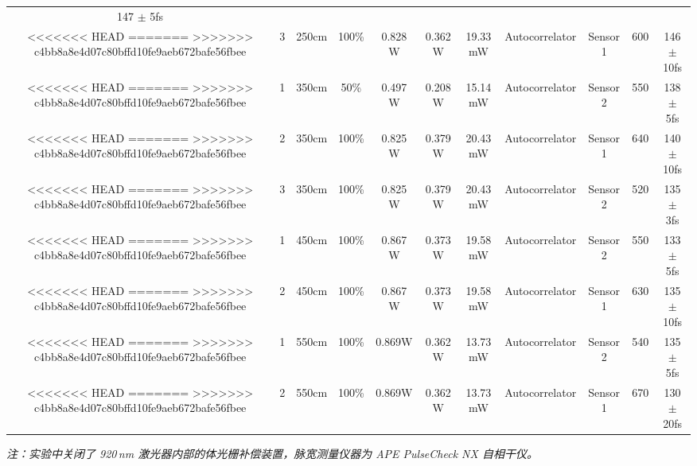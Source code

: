 \begin{table}[htbp]
{\begin{tabular}{ccccccccccc}
  147 $\pm$ 5fs \\
<<<<<<< HEAD
\rowcolor[HTML]{E7EAED}
=======
\rowcolor[HTML]{E7EAED} 
>>>>>>> c4bb8a8e4d07c80bffd10fe9aeb672bafe56fbee
\multirow{-3}{*}{\cellcolor[HTML]{E7EAED}1} &
  3 &
  \cellcolor[HTML]{FFC000}250cm &
  100\% &
  0.828 W &
  0.362 W &
  19.33 mW &
  Autocorrelator &
  Sensor 1 &
  600 &
  146 $\pm$ 10fs \\ \hline
<<<<<<< HEAD
\rowcolor[HTML]{E7EAED}
=======
\rowcolor[HTML]{E7EAED} 
>>>>>>> c4bb8a8e4d07c80bffd10fe9aeb672bafe56fbee
\cellcolor[HTML]{E7EAED} &
  1 &
  \cellcolor[HTML]{83CBEB}350cm &
  50\% &
  0.497 W &
  0.208 W &
  15.14 mW &
  Autocorrelator &
  Sensor 2 &
  550 &
  138 $\pm$ 5fs \\
<<<<<<< HEAD
\rowcolor[HTML]{E7EAED}
=======
\rowcolor[HTML]{E7EAED} 
>>>>>>> c4bb8a8e4d07c80bffd10fe9aeb672bafe56fbee
\cellcolor[HTML]{E7EAED} &
  2 &
  \cellcolor[HTML]{83CBEB}350cm &
  100\% &
  0.825 W &
  0.379 W &
  20.43 mW &
  Autocorrelator &
  Sensor 1 &
  640 &
  140 $\pm$ 10fs \\
<<<<<<< HEAD
\rowcolor[HTML]{E7EAED}
=======
\rowcolor[HTML]{E7EAED} 
>>>>>>> c4bb8a8e4d07c80bffd10fe9aeb672bafe56fbee
\multirow{-3}{*}{\cellcolor[HTML]{E7EAED}2} &
  3 &
  \cellcolor[HTML]{83CBEB}350cm &
  100\% &
  0.825 W &
  0.379 W &
  20.43 mW &
  Autocorrelator &
  Sensor 2 &
  520 &
  135 $\pm$ 3fs \\ \hline
<<<<<<< HEAD
\rowcolor[HTML]{E7EAED}
=======
\rowcolor[HTML]{E7EAED} 
>>>>>>> c4bb8a8e4d07c80bffd10fe9aeb672bafe56fbee
\cellcolor[HTML]{E7EAED} &
  1 &
  \cellcolor[HTML]{E59EDD}450cm &
  100\% &
  0.867 W &
  0.373 W &
  19.58 mW &
  Autocorrelator &
  Sensor 2 &
  550 &
  133 $\pm$ 5fs \\
<<<<<<< HEAD
\rowcolor[HTML]{E7EAED}
=======
\rowcolor[HTML]{E7EAED} 
>>>>>>> c4bb8a8e4d07c80bffd10fe9aeb672bafe56fbee
\multirow{-2}{*}{\cellcolor[HTML]{E7EAED}3} &
  2 &
  \cellcolor[HTML]{E59EDD}450cm &
  100\% &
  0.867 W &
  0.373 W &
  19.58 mW &
  Autocorrelator &
  Sensor 1 &
  630 &
  135 $\pm$ 10fs \\ \hline
<<<<<<< HEAD
\rowcolor[HTML]{E7EAED}
=======
\rowcolor[HTML]{E7EAED} 
>>>>>>> c4bb8a8e4d07c80bffd10fe9aeb672bafe56fbee
\cellcolor[HTML]{E7EAED} &
  1 &
  \cellcolor[HTML]{8ED973}550cm &
  100\% &
  0.869W &
  0.362 W &
  13.73 mW &
  Autocorrelator &
  Sensor 2 &
  540 &
  135 $\pm$ 5fs \\
<<<<<<< HEAD
\rowcolor[HTML]{E7EAED}
=======
\rowcolor[HTML]{E7EAED} 
>>>>>>> c4bb8a8e4d07c80bffd10fe9aeb672bafe56fbee
\multirow{-2}{*}{\cellcolor[HTML]{E7EAED}4} &
  2 &
  \cellcolor[HTML]{8ED973}550cm &
  100\% &
  0.869W &
  0.362 W &
  13.73 mW &
  Autocorrelator &
  Sensor 1 &
  670 &
  130 $\pm$ 20fs \\ \hline
\end{tabular}%
}
\vspace{2mm}
\begin{minipage}{\textwidth}
\footnotesize
\textit{注：实验中关闭了 920\,nm 激光器内部的体光栅补偿装置，脉宽测量仪器为 APE PulseCheck NX 自相干仪。}
\end{minipage}
\end{table}

